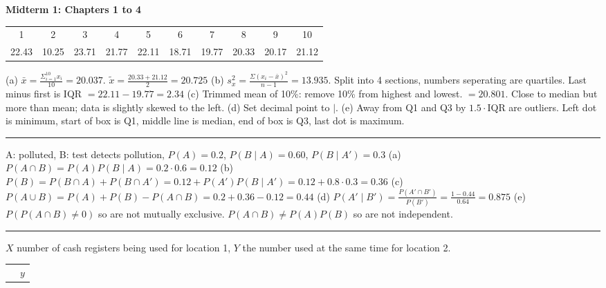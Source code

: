 \documentclass[9pt]{article}
\newcommand*\mean[1]{\bar{#1}}
\newcommand*\median[1]{\tilde{#1}}
\begin{document}
\addtolength{\tabcolsep}{-2pt}
\begin{multicols*}{2}
    \noindent\textbf{Midterm 1: Chapters 1 to 4}
    
    \noindent\begin{tabular*}{0.5\textwidth}{c c c c c c c c c c}
        \hline
        1 & 2 & 3 & 4 & 5 & 6 & 7 & 8 & 9 & 10\\
        22.43 & 10.25 & 23.71 & 21.77 & 22.11 & 18.71 & 19.77 & 20.33 & 20.17 & 21.12\\
        \hline
    \end{tabular*}
    (a) $\mean{x}=\frac{\Sigma_{i=1}^{10}x_i}{10} = 20.037$. 
    $\median{x}=\frac{20.33 + 21.12}{2} = 20.725$\newline
    (b) $s_{x}^{2}=\frac{\Sigma(x_i-\mean{x})^2}{n-1} = 13.935$. 
    Split into 4 sections, numbers seperating are quartiles. 
    Last minus first is IQR $=22.11-19.77 = 2.34$\newline
    (c) Trimmed mean of 10\%: remove 10\% from highest and lowest. $= 20.801$.
    Close to median but more than mean; data is slightly skewed to the left.\newline
    (d) Set decimal point to $\mid$.\newline
    (e) Away from Q1 and Q3 by $1.5\cdot$IQR are outliers. Left dot is minimum, start of
    box is Q1, middle line is median, end of box is Q3, last dot is maximum.
    \rule{0.5\textwidth}{0.4pt}
    \noindent A: polluted, B: test detects pollution, $P(A)=0.2$, $P(B\mid A)=0.60$, 
    $P(B\mid A')=0.3$\newline
    (a) $P(A\cap B)=P(A)P(B\mid A) = 0.2\cdot 0.6=0.12$\newline
    (b) $P(B) = P(B\cap A) + P(B\cap A') = 0.12 + P(A')P(B\mid A') = 0.12 + 0.8 
    \cdot 0.3 = 0.36$\newline
    (c) $P(A\cup B) = P(A)+P(B) - P(A\cap B) = 0.2 + 0.36 - 0.12 = 0.44$\newline
    (d) $P(A'\mid B')=\frac{P(A'\cap B')}{P(B')} = \frac{1 - 0.44}{0.64} = 0.875$
    (e) $P(P(A\cap B) \not= 0)$ so are not mutually exclusive.
    $P(A\cap B) \not= P(A)P(B)$ so are not independent.
    \rule{0.5\textwidth}{0.4pt}
    \noindent $X$ number of cash registers being used for location 1, 
    $Y$ the number used at the same time for location 2.
    \begin{wraptable}{l}{3.8cm}
        \begin{tabular}{c | c | c c c}
            \multicolumn{2}{c|}{} & \multicolumn{3}{c}{$y$}\\

\end{tabular}
\end{wraptable}
\end{multicols*}
\end{document}
